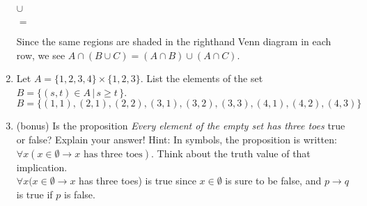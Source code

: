 \documentclass[11pt]{amsart}
\begin{document}
\begin{enumerate}
\raisebox{-1.0cm}
 {   
}
 $\cup$   
\raisebox{-1.0cm}
 {   
}
$=$
\raisebox{-1.0cm}
 {   
}
\vskip 10pt
{\color{blue}
Since the same regions are shaded in the righthand Venn diagram in each row, we see
$A\cap (B \cup C) = (A\cap B)\cup(A\cap C)$.}\\[5pt]


\item Let $A=\{1,2,3,4\}\times\{1,2,3\}$. List the elements of the set
$B= \{ (s,t)\in A\,|\, s\geq t\,\}$.\\[3pt] 
{\color{blue} $B =\{ (1,1), (2,1), (2,2), (3,1), (3,2), (3,3), (4,1), (4,2), (4,3)\}$}\\[5pt]

\item (bonus) Is the proposition {\it Every element of the empty set has 
three toes} true or false? Explain your answer! Hint: In symbols, the proposition is written:
  $\forall x (x\in \emptyset \longrightarrow x \text{ has three toes})$. Think about the truth value of that implication.\\[3pt]
  {\color{blue} $\forall x (x\in \emptyset \to x $ has three toes)
 is true since  $x\in\emptyset$
 is sure to be false, and  $p\to q$  is true if  $p$ is false.
 }\\[5pt]

\end{enumerate}
\end{document}
